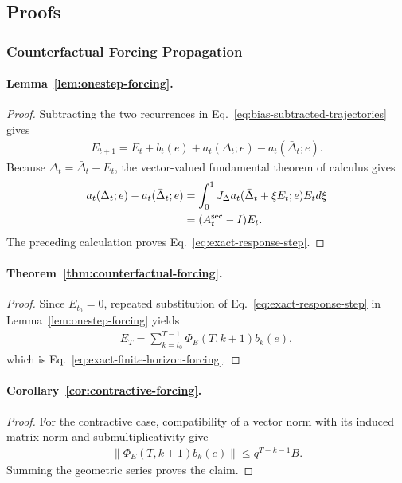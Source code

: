 \documentclass[letterpaper]{article} %
\newcommand{\norm}[1]{\lVert#1\rVert}
\theoremstyle{remark}
\begin{document}
\subsection{Proofs}
\label{app:proofs}

\subsubsection{Counterfactual Forcing Propagation}
\paragraph{Lemma~\ref{lem:onestep-forcing}.}
\begin{proof}
	Subtracting the two recurrences in Eq.~\ref{eq:bias-subtracted-trajectories} gives
	\begin{align*}
		E_{t+1}
		=E_t+b_t(e)+a_t(\Delta_t;e)-a_t(\bar\Delta_t;e).
	\end{align*}
	Because $\Delta_t=\bar\Delta_t+E_t$, the vector-valued fundamental theorem of calculus gives
	\begin{align*}
		a_t(\Delta_t;e)-a_t(\bar\Delta_t;e)
		 & =\int_0^1J_\Delta a_t(\bar\Delta_t+\xi E_t;e)E_t d\xi \\
		 & =(A_t^{\rm sec}-I)E_t.
	\end{align*}
	The preceding calculation proves Eq.~\ref{eq:exact-response-step}.
\end{proof}

\paragraph{Theorem~\ref{thm:counterfactual-forcing}.}
\begin{proof}
	Since $E_{t_0}=0$, repeated substitution of Eq.~\ref{eq:exact-response-step} in Lemma~\ref{lem:onestep-forcing} yields
	\begin{align*}
		E_T
		=\sum_{k=t_0}^{T-1}\Phi_E(T,k+1)b_k(e),
	\end{align*}
	which is Eq.~\ref{eq:exact-finite-horizon-forcing}.
\end{proof}

\paragraph{Corollary~\ref{cor:contractive-forcing}.}
\begin{proof}
	For the contractive case, compatibility of a vector norm with its induced matrix norm and submultiplicativity give
	\begin{align*}
		\norm{\Phi_E(T,k+1)b_k(e)}
		\leq q^{T-k-1}B.
	\end{align*}
	Summing the geometric series proves the claim.
\end{proof}
\end{document}
